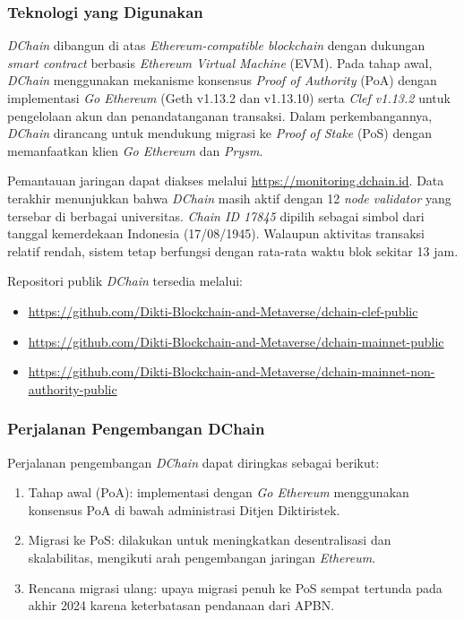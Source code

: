 \subsubsection{Teknologi yang Digunakan}

\textit{DChain} dibangun di atas \textit{Ethereum-compatible blockchain} dengan dukungan \textit{smart contract} berbasis \textit{Ethereum Virtual Machine} (EVM). Pada tahap awal, \textit{DChain} menggunakan mekanisme konsensus \textit{Proof of Authority} (PoA) dengan implementasi \textit{Go Ethereum} (Geth v1.13.2 dan v1.13.10) serta \textit{Clef v1.13.2} untuk pengelolaan akun dan penandatanganan transaksi. Dalam perkembangannya, \textit{DChain} dirancang untuk mendukung migrasi ke \textit{Proof of Stake} (PoS) dengan memanfaatkan klien \textit{Go Ethereum} dan \textit{Prysm}.

Pemantauan jaringan dapat diakses melalui \url{https://monitoring.dchain.id}. Data terakhir menunjukkan bahwa \textit{DChain} masih aktif dengan 12 \textit{node validator} yang tersebar di berbagai universitas. \textit{Chain ID 17845} dipilih sebagai simbol dari tanggal kemerdekaan Indonesia (17/08/1945). Walaupun aktivitas transaksi relatif rendah, sistem tetap berfungsi dengan rata-rata waktu blok sekitar 13 jam.

Repositori publik \textit{DChain} tersedia melalui:
\begin{itemize}[nolistsep]
    \item \url{https://github.com/Dikti-Blockchain-and-Metaverse/dchain-clef-public}
    \item \url{https://github.com/Dikti-Blockchain-and-Metaverse/dchain-mainnet-public}
    \item \url{https://github.com/Dikti-Blockchain-and-Metaverse/dchain-mainnet-non-authority-public}
\end{itemize}

\subsubsection{Perjalanan Pengembangan DChain}

Perjalanan pengembangan \textit{DChain} dapat diringkas sebagai berikut:
\begin{enumerate}[nolistsep]
    \item Tahap awal (PoA): implementasi dengan \textit{Go Ethereum} menggunakan konsensus PoA di bawah administrasi Ditjen Diktiristek.
    \item Migrasi ke PoS: dilakukan untuk meningkatkan desentralisasi dan skalabilitas, mengikuti arah pengembangan jaringan \textit{Ethereum}.
    \item Rencana migrasi ulang: upaya migrasi penuh ke PoS sempat tertunda pada akhir 2024 karena keterbatasan pendanaan dari APBN.
\end{enumerate}

